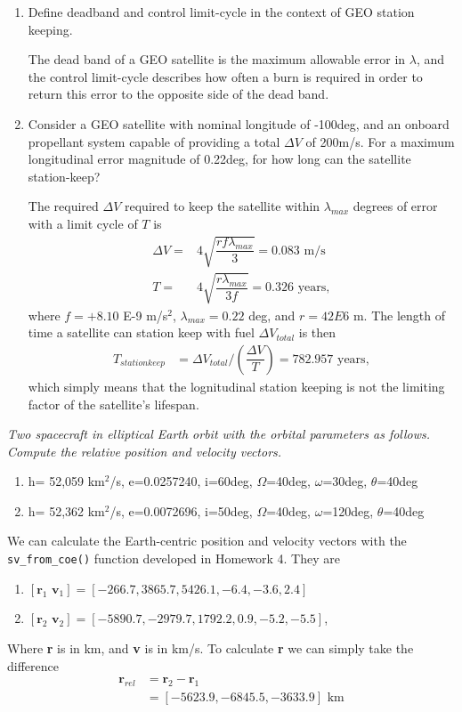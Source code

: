 \documentclass[onecolumn,10pt]{jhwhw}
\begin{document}
\begin{enumerate}
\item Define deadband and control limit-cycle in the context of GEO station keeping.

The dead band of a GEO satellite is the maximum allowable error in $\lambda$, and the control limit-cycle describes how often a burn is required in order to return this error to the opposite side of the dead band.

\item Consider a GEO satellite with nominal longitude of -100deg, and an onboard propellant system capable of providing a total $\Delta V$ of 200m/s. For a maximum longitudinal error magnitude of 0.22deg, for how long can the satellite station-keep?

The required $\Delta V$ required to keep the satellite within $\lambda_{max}$ degrees of error with a limit cycle of $T$ is
\begin{align*}
\Delta V =& 4 \sqrt{\dfrac{rf \lambda_{max}}{3}} = 0.083 \mbox{ m/s}\\
       T =& 4 \sqrt{\dfrac{r \lambda_{max}}{3f}} = 0.326 \mbox{ years},
\end{align*}
where $f = +8.10$ E-9 m/s$^2$, $\lambda_{max} = 0.22$ deg, and $r = 42E6$ m. The length of time a satellite can station keep with fuel $\Delta V_{total}$ is then
\begin{align*}
T_{station keep} &= \Delta V_{total} / \left( \dfrac{\Delta V}{T} \right) = 782.957 \mbox{ years},
\end{align*}
which simply means that the lognitudinal station keeping is not the limiting factor of the satellite's lifespan.
\end{enumerate}

\problem{}
\textit{Two spacecraft in elliptical Earth orbit with the orbital parameters as follows. Compute the relative position and velocity vectors.}
\begin{enumerate}
\itemsep0em
\item h= 52,059 km$^2$/s, e=0.0257240, i=60deg, $\Omega$=40deg, $\omega$=30deg, $\theta$=40deg
\item h= 52,362 km$^2$/s, e=0.0072696, i=50deg, $\Omega$=40deg, $\omega$=120deg, $\theta$=40deg
\end{enumerate}

We can calculate the Earth-centric position and velocity vectors with the \verb|sv_from_coe()| function developed in Homework 4. They are
\begin{enumerate}
\itemsep0em
\item $[\textbf{r}_1 \textbf{ v}_1] = [-266.7,  3865.7,  5426.1, -6.4 , -3.6,  2.4]$
\item $[\textbf{r}_2 \textbf{ v}_2] = [-5890.7, -2979.7,  1792.2, 0.9, -5.2, -5.5]$,
\end{enumerate}
Where \textbf{r} is in km, and \textbf{v} is in km/s. To calculate \textbf{r} we can simply take the difference
\begin{align*}
   \textbf{r}_{rel} &= \textbf{r}_2 - \textbf{r}_1 \\
                    &= [-5623.9, -6845.5, -3633.9] \mbox{ km}
\end{align*}
\end{document}
